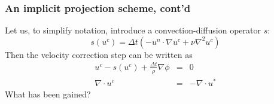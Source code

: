 \begin{frame}
\frametitle{An implicit projection scheme, cont'd}
Let us, to simplify notation, introduce
a convection-diffusion operator $s$: 
\[
s(u^c) =   \Delta t (-u^n \cdot \nabla u^c +  \nu \nabla^2 u^c)  
\]
Then the velocity correction step can be written as 
\begin{eqnarray*}
u^c - s(u^c) + \frac{\Delta t}{\rho} \nabla \phi &=& 0 \\ 
\nabla \cdot u^c &=& -\nabla \cdot u^* 
\end{eqnarray*}
What has been gained? 
\end{frame}

